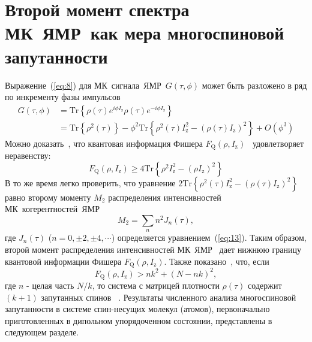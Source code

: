 \documentclass[utf8]{jetp}
\begin{document}
\section{Второй момент спектра МК~ЯМР~как мера многоспиновой запутанности}
\label{sec:4}

Выражение~(\ref{eq:8}) для МК~сигнала~ЯМР~$G(\tau,\phi)$ может быть разложено в ряд по инкременту фазы импульсов
%
\begin{equation}
  \begin{split}
    \label{eq:17}
    G(\tau,\phi)
    & = \mathrm{Tr} \left\{
      \rho(\tau) e^{i \phi I_\mathrm{z} }
      \rho(\tau) e^{-i\phi I_\mathrm{z}}
    \right\} \\
    & = \mathrm{Tr} \left\{ \rho^2(\tau) \right\}
    - \phi^2 \mathrm{Tr} \left\{
      \rho^2(\tau) I^2_\mathrm{z}
      - (\rho(\tau) I_\mathrm{z})^2
    \right\}
    + O(\phi^3)
  \end{split}
\end{equation}
%
Можно доказать~\cite{Girolami_2017}, что квантовая информация Фишера $F_\mathrm{Q}(\rho,I_\mathrm{z})$~\cite{Helstrom_1976} удовлетворяет неравенству:
%
\begin{equation}
  \label{eq:18}
  F_\mathrm{Q}(\rho,I_\mathrm{z}) \geq 4 \mathrm{Tr} \left\{ \rho^2 I^2_\mathrm{z} - (\rho I_\mathrm{z})^2 \right\}
\end{equation}
%
В то же время легко проверить, что уравнение $2 \mathrm{Tr} \left\{ \rho^2(\tau) I_\mathrm{z}^2 - \left( \rho(\tau) I_\mathrm{z} \right)^2 \right\}$ равно второму моменту $M_2$ распределения интенсивностей МК~когерентностей~ЯМР~\cite{Khitrin_1997}
%
\begin{equation}
  \label{eq:19}
  M_2 = \sum_{n} n^2 J_n (\tau) ,
\end{equation}
%
где $J_n(\tau)$ ($n=0,\pm 2, \pm 4, \cdots$) определяется уравнением~(\ref{eq:13}).
Таким образом, второй момент распределения интенсивностей МК~ЯМР~ дает нижнюю границу квантовой информации Фишера $F_\mathrm{Q}(\rho,I_\mathrm{z})$.
Также показано~\cite{T_th_2014,Pezz__2018}, что, если
%
\begin{equation}
  \label{eq:20}
  F_\mathrm{Q} (\rho,I_\mathrm{z}) > n k^2 + (N - n k)^2,
\end{equation}
%
где $n$ - целая часть ${N/k}$, то система с матрицей плотности $\rho(\tau)$ содержит  $(k+1)$ запутанных спинов ~\cite{Pezz__2009,Hyllus_2012,T_th_2012}.
Результаты численного анализа многоспиновой запутанности в системе спин-несущих молекул (атомов), первоначально приготовленных в дипольном упорядоченном состоянии, представлены в следующем разделе.
\end{document}
